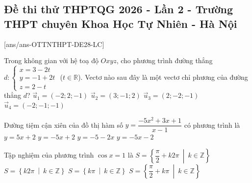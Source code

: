 \subsection*{Đề thi thử THPTQG 2026 - Lần 2 - Trường THPT chuyên Khoa Học Tự Nhiên - Hà Nội }
[ans/ans-OTTNTHPT-DE28-LC]

\caulc

\begin{ex}%
Trong không gian với hệ toạ độ $Oxyz$, cho phương trình đường thẳng $d \colon \begin{cases} x = 3 - 2t \\ y = -1 + 2t \\ z = 2 - t \end{cases}$ ($t \in \mathbb{R}$). Vectơ nào sau đây là một vectơ chỉ phương của đường thẳng $d$?
\choice
{\True $\vec{u}_1=(-2;2;-1)$}
{$\vec{u}_2=(3;-1;2)$}
{$\vec{u}_3=(2;-2;-1)$}
{$\vec{u}_4=(-2;-1;-1)$}
\end{ex}

\begin{ex}%
Đường tiệm cận xiên của đồ thị hàm số $y=\dfrac{-5x^{2}+3x+1}{x-1}$ có phương trình là
\choice
{$y=5x+2$}
{$y=-5x+2$}
{$y=-5-2x$}
{\True $y=-5x-2$}
\end{ex}

\begin{ex}%
Tập nghiệm của phương trình $\cos x = 1$ là
\choice
{$S=\left\{\dfrac{\pi}{2}+k2\pi \ \middle| \ k \in \mathbb{Z}\right\}$}
{\True $S=\left\{k2\pi \ \middle| \ k \in \mathbb{Z}\right\}$}
{$S=\left\{k\pi \ \middle| \ k \in \mathbb{Z}\right\}$}
{$S=\left\{\dfrac{\pi}{2}+k\pi \ \middle| \ k \in \mathbb{Z}\right\}$}
\end{ex}

